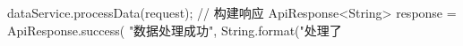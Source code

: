 dataService.processData(request); // 构建响应 ApiResponse<String> response = ApiResponse.success( "数据处理成功", String.format("处理了%